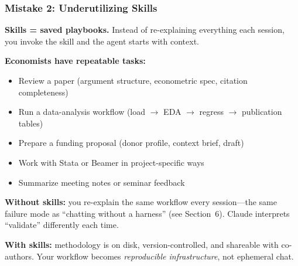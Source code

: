 \documentclass[10pt,english,aspectratio=169]{beamer}
\begin{document}
\begin{frame}
\frametitle{Mistake 2: Underutilizing Skills}

\textbf{Skills = saved playbooks.} Instead of re-explaining everything each session, you invoke the skill and the agent starts with context.

\vspace{0.3cm}

\textbf{Economists have repeatable tasks:}
\begin{itemize}
    \item Review a paper (argument structure, econometric spec, citation completeness)
    \item Run a data-analysis workflow (load $\to$ EDA $\to$ regress $\to$ publication tables)
    \item Prepare a funding proposal (donor profile, context brief, draft)
    \item Work with Stata or Beamer in project-specific ways
    \item Summarize meeting notes or seminar feedback
\end{itemize}

\vspace{0.3cm}

\textbf{Without skills:} you re-explain the same workflow every session---the same failure mode as ``chatting without a harness'' (see Section~6). Claude interprets ``validate'' differently each time.

\vspace{0.2cm}

\textbf{With skills:} methodology is on disk, version-controlled, and shareable with co-authors. Your workflow becomes \textit{reproducible infrastructure}, not ephemeral chat.
\end{frame}
\end{document}
